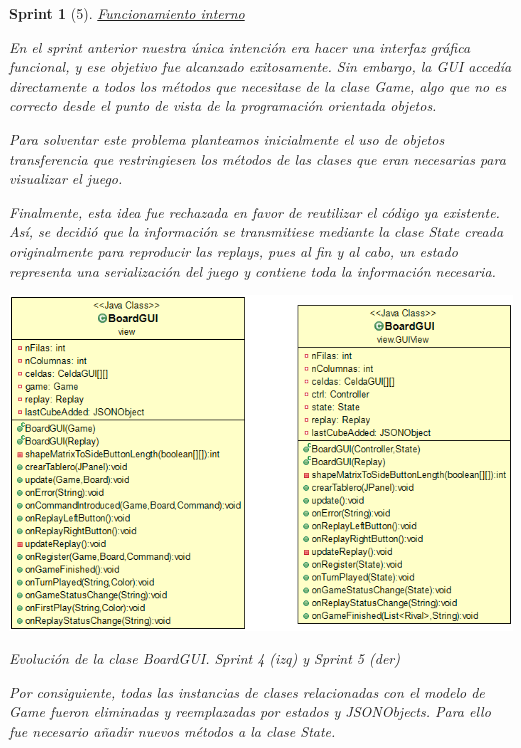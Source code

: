 \documentclass[12pt,a4paper,openright]{book}
\theoremstyle{break}
\newtheorem*{sprint}{Sprint}
\begin{document}
\begin{sprint}[5]
\underline{Funcionamiento interno}

En el sprint anterior nuestra única intención era hacer una interfaz gráfica funcional, y ese objetivo fue alcanzado exitosamente. Sin embargo, la GUI accedía directamente a todos los métodos que necesitase de la clase \textit{Game}, algo que no es correcto desde el punto de vista de la programación orientada objetos.

Para solventar este problema planteamos inicialmente el uso de objetos transferencia que restringiesen los métodos de las clases que eran necesarias para visualizar el juego.

Finalmente, esta idea fue rechazada en favor de reutilizar el código ya existente. Así, se decidió que la información se transmitiese mediante la clase \textit{State} creada originalmente para reproducir las \textit{replays}, pues al fin y al cabo, un estado representa una serialización del juego y contiene toda la información necesaria.

\begin{center}
\includegraphics[scale=0.5]{board-gui-evol.png}

Evolución de la clase \textit{BoardGUI}. Sprint 4 (izq) y Sprint 5 (der)
\end{center}

Por consiguiente, todas las instancias de clases relacionadas con el modelo de \textit{Game} fueron eliminadas y reemplazadas por estados y JSONObjects. Para ello fue necesario añadir nuevos métodos a la clase \textit{State}.


\end{sprint}
\end{document}

